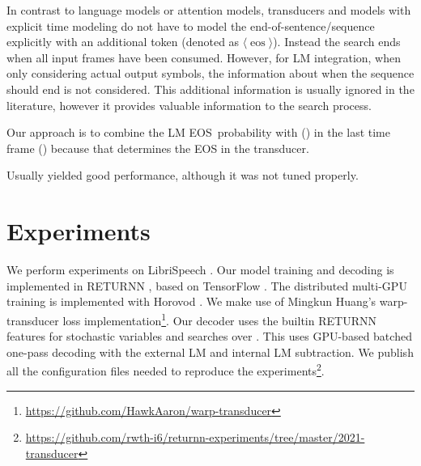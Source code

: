 \documentclass[a4paper]{article}
\newcommand{\eos}{\ensuremath{\langle\operatorname{eos}\rangle}}
\begin{document}
In contrast to language models or attention models,
transducers and models with explicit time modeling
do not have to model the end-of-sentence/sequence explicitly
with an additional token (denoted as \eos).
Instead the search ends when all input frames have been consumed.
However, for LM integration, when only considering actual output symbols,
the information about when the sequence should end is not considered.
This additional information is usually ignored in the literature,
however it provides valuable information to the search process.










Our approach is to combine the LM EOS~probability
with  () in the last time frame ()
because that determines the EOS in the transducer.

Usually  yielded good performance,
although it was not tuned properly.


\section{Experiments}

We perform experiments on LibriSpeech \cite{panayotov2015librispeech}.
Our model training and decoding is implemented in RETURNN \cite{zeyer2018:returnn},
based on TensorFlow \cite{tensorflow2015}.
The distributed multi-GPU training is implemented with Horovod \cite{sergeev2018horovod}.
We make use of Mingkun Huang's warp-transducer loss implementation\footnote{\scriptsize\url{https://github.com/HawkAaron/warp-transducer}}.
Our decoder uses the builtin RETURNN features for stochastic variables
and searches over .
This uses GPU-based batched one-pass decoding with the external LM and internal LM subtraction.
We publish all the configuration files needed to reproduce the experiments\footnote{\scriptsize\url{https://github.com/rwth-i6/returnn-experiments/tree/master/2021-transducer}}.
\end{document}
